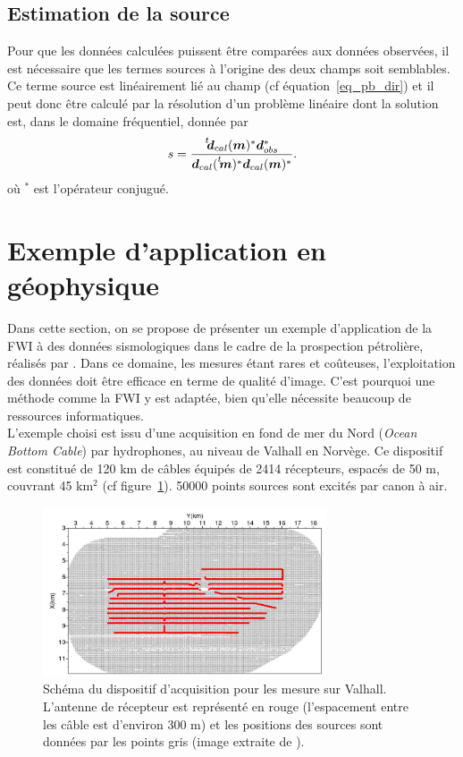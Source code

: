 \subsection{Estimation de la source}
Pour que les données calculées puissent être comparées aux données observées, il est nécessaire que les termes sources à l'origine des deux champs soit semblables. Ce terme source est linéairement lié au champ (cf équation~\ref{eq_pb_dir}) et il peut donc être calculé par la résolution d'un problème linéaire \citep{pratt_99} dont la solution est, dans le domaine fréquentiel, donnée par 
\begin{equation}
s=\frac{\tr{\bm{d}_{cal}(\bm{m})^{*}}\bm{d}_{obs}^{*}}{\bm{d}_{cal}(\tr{\bm{m})^{*}}\bm{d}_{cal}(\bm{m})^{*}}\text{.}
\end{equation}
où $^{*}$ est l'opérateur conjugué.
 


\section{Exemple d'application en géophysique}

Dans cette section, on se propose de présenter un exemple d'application de la FWI à des données sismologiques dans le cadre de la prospection pétrolière, réalisés par \cite{sirgue_valhall}. Dans ce domaine, les mesures étant rares et coûteuses, l'exploitation des données doit être efficace en terme de qualité d'image. C'est pourquoi une méthode comme la FWI y est adaptée, bien qu'elle nécessite beaucoup de ressources informatiques.\\

L'exemple choisi est issu d'une acquisition en fond de mer du Nord (\emph{Ocean Bottom Cable}) par hydrophones, au niveau de Valhall en Norvège. Ce dispositif est constitué de 120 km de câbles équipés de 2414 récepteurs, espacés de 50 m, couvrant 45 km$^{2}$ (cf figure~\ref{dispositif_valhall}). 50000 points sources sont excités par canon à air.

\begin{figure}[!h]
	\centering
	\includegraphics[height=5cm]{img/dispo_valhall.jpg}
	\caption{Schéma du dispositif d'acquisition pour les mesure sur Valhall. L'antenne de récepteur est représenté en rouge (l'espacement entre les câble est d'environ 300 m) et les positions des sources sont données par les points gris (image extraite de \cite{sirgue_valhall}).\label{dispositif_valhall} }
\end{figure}

